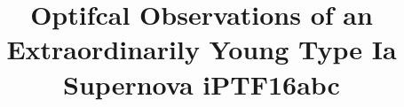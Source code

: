 \documentclass[twocolumn]{aastex61}
\begin{document}
\title{Optifcal Observations of an Extraordinarily Young Type Ia Supernova iPTF16abc}


\end{document}
